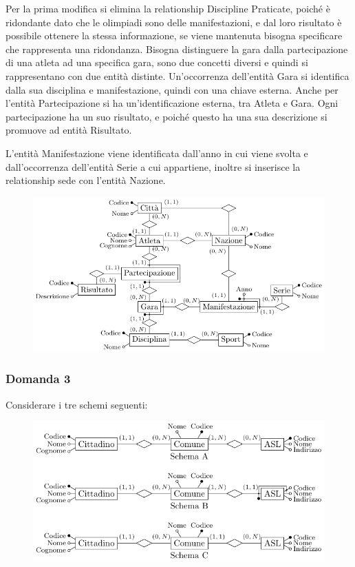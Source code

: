 \documentclass{article}
\numberwithin{equation}{subsection}
\begin{document}
Per la prima modifica si elimina la relationship Discipline Praticate, poiché è ridondante dato che le olimpiadi sono delle manifestazioni, e dal loro risultato è possibile ottenere la stessa informazione, se viene mantenuta bisogna specificare che rappresenta una ridondanza. Bisogna distinguere la gara dalla partecipazione di una atleta ad una specifica gara, sono due concetti diversi e quindi si rappresentano con due entità distinte. 
Un'occorrenza dell'entità Gara si identifica dalla sua disciplina e manifestazione, quindi con una chiave esterna. Anche per l'entità Partecipazione si ha un'identificazione esterna, tra Atleta e Gara. Ogni partecipazione ha un suo risultato, e poiché questo ha una sua descrizione si promuove ad entità Risultato. 

L'entità Manifestazione viene identificata dall'anno in cui viene svolta e dall'occorrenza dell'entità Serie a cui appartiene, inoltre si inserisce la relationship sede con l'entità Nazione. 



\begin{figure}[H]%
    \centering%
    \includegraphics{schema_2_16-12-24.pdf}%
\end{figure}

\subsubsection*{Domanda 3}

Considerare i tre schemi seguenti:

\begin{figure}[H]%
    \centering%
    \includegraphics{schema_3_16-12-24.pdf}%
\end{figure}
\end{document}
